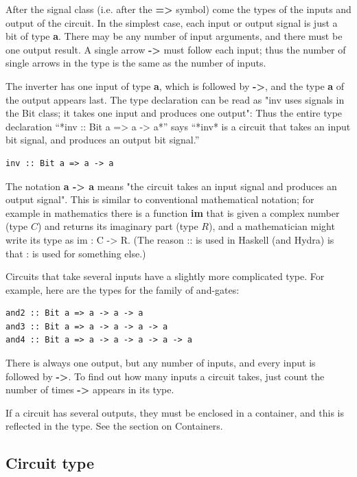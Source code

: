 \documentclass[]{svmono}
\begin{document}
After the signal class (i.e. after the \textbf{=>} symbol) come the types
of the inputs and output of the circuit.  In the simplest case,
each input or output signal is just a bit of type \textbf{a}.  There may
be any number of input arguments, and there must be one output
result.  A single arrow \textbf{->} must follow each input; thus the
number of single arrows in the type is the same as the number of
inputs.

The inverter has one input of type \textbf{a}, which is followed by \textbf{->},
and the type \textbf{a} of the output appears last.  The type declaration
can be read as "inv uses signals in the Bit class; it takes one
input and produces one output": Thus the entire type declaration
``*inv :: Bit a => a -> a*'' says ``*inv* is a circuit that takes
an input bit signal, and produces an output bit signal.''

\begin{verbatim}
inv :: Bit a => a -> a
\end{verbatim}

The notation \textbf{a -> a} means "the circuit takes an input signal and
produces an output signal".  This is similar to conventional
mathematical notation; for example in mathematics there is a
function \textbf{im} that is given a complex number (type \(C\)) and
returns its imaginary part (type \(R\)), and a mathematician might
write its type as im : C -> R.  (The reason :: is used in Haskell
(and Hydra) is that : is used for something else.)

Circuits that take several inputs have a slightly more complicated
type.  For example, here are the types for the family of
and-gates:

\begin{verbatim}
and2 :: Bit a => a -> a -> a
and3 :: Bit a => a -> a -> a -> a
and4 :: Bit a => a -> a -> a -> a -> a
\end{verbatim}

There is always one output, but any number of inputs, and every
input is followed by \textbf{->}.  To find out how many inputs a circuit
takes, just count the number of times \textbf{->} appears in its type.

If a circuit has several outputs, they must be enclosed in a
container, and this is reflected in the type.  See the section on
Containers.
\subsection*{Circuit type}
\label{sec:org46769cd}
\end{document}
